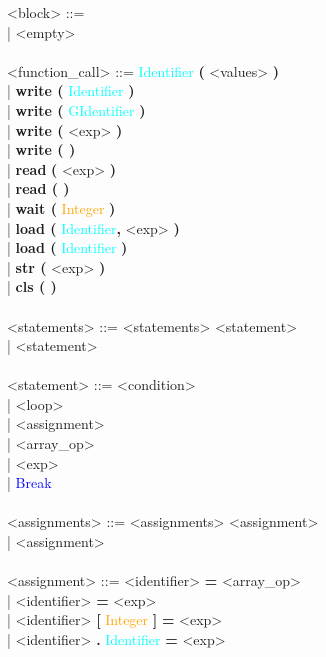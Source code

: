 \documentclass{Dokumentmall}
\begin{document}
\begin{tabbing}
  \><block> \>::= \\
  \> \>| \> { <empty> }\\\\

  \><function\_call> \>::= \>\textcolor{Cyan}{Identifier} \textbf{(} <values> \textbf{)}\\
  \> \>| \> \textbf{write (} \textcolor{Cyan}{Identifier} \textbf{)}\\
  \> \>| \> \textbf{write (} \textcolor{Cyan}{GIdentifier} \textbf{)}\\
  \> \>| \> \textbf{write (} <exp> \textbf{)}\\
  \> \>| \> \textbf{write ( )}\\
  \> \>| \> \textbf{read} \textbf{(} <exp> \textbf{)}\\
  \> \>| \> \textbf{read ( )}\\
  \> \>| \> \textbf{wait (} \textcolor{orange}{Integer} \textbf{)}\\
  \> \>| \> \textbf{load (} \textcolor{Cyan}{Identifier}\textbf{,} <exp> \textbf{)}\\
  \> \>| \> \textbf{load (} \textcolor{Cyan}{Identifier} \textbf{)}\\
  \> \>| \> \textbf{str (} <exp> \textbf{)}\\
  \> \>| \> \textbf{cls ( )}\\\\


  \><statements> \>::= \><statements> <statement>\\
  \> \>| \> <statement>\\\\

  \><statement> \>::= \><condition>\\
  \> \>| \> <loop>\\
  \> \>| \> <assignment>\\
  \> \>| \> <array\_op>\\
  \> \>| \> <exp>\\
  \> \>| \> \textcolor{blue}{Break}\\\\

  \><assignments> \>::= \><assignments> <assignment>\\
  \> \>| \> <assignment>\\\\

  \><assignment> \>::= \><identifier> \textbf{=} <array\_op>\\
  \> \>| \> <identifier> \textbf{=} <exp>\\
  \> \>| \> <identifier> \textbf{[} \textcolor{orange}{Integer} \textbf{]} \textbf{=} <exp>\\
  \> \>| \> <identifier> \textbf{.} \textcolor{Cyan}{Identifier}  \textbf{=} <exp>\\\\


\end{tabbing}
\end{document}
